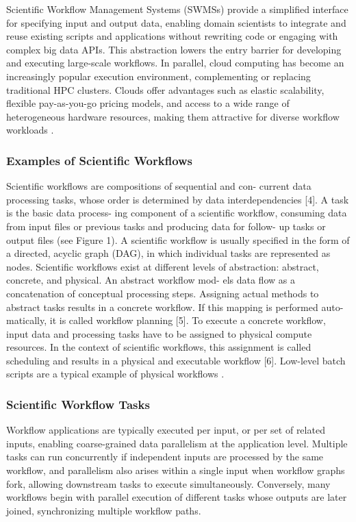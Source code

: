 Scientific Workflow Management Systems (SWMSs) provide a simplified interface for specifying input and output data, enabling domain scientists to integrate and reuse existing scripts and applications without rewriting code or engaging with complex big data APIs. This abstraction lowers the entry barrier for developing and executing large-scale workflows. In parallel, cloud computing has become an increasingly popular execution environment, complementing or replacing traditional HPC clusters. Clouds offer advantages such as elastic scalability, flexible pay-as-you-go pricing models, and access to a wide range of heterogeneous hardware resources, making them attractive for diverse workflow workloads \cite{Bader_2022}.


\subsubsection{Examples of Scientific Workflows}
\label{sec:background_workflows_examples}
Scientific workflows are compositions of sequential and con- current data processing tasks, whose order is determined by data interdependencies [4]. A task is the basic data process- ing component of a scientific workflow, consuming data from input files or previous tasks and producing data for follow- up tasks or output files (see Figure 1). A scientific workflow is usually specified in the form of a directed, acyclic graph (DAG), in which individual tasks are represented as nodes. Scientific workflows exist at different levels of abstraction: abstract, concrete, and physical. An abstract workflow mod- els data flow as a concatenation of conceptual processing steps. Assigning actual methods to abstract tasks results in a concrete workflow. If this mapping is performed auto- matically, it is called workflow planning [5]. To execute a concrete workflow, input data and processing tasks have to be assigned to physical compute resources. In the context of scientific workflows, this assignment is called scheduling and results in a physical and executable workflow [6]. Low-level batch scripts are a typical example of physical workflows \cite{Bux2013}.

\subsubsection{Scientific Workflow Tasks}
\label{sec:background_workflows_examples}
Workflow applications are typically executed per input, or per set of related inputs, enabling coarse-grained data parallelism at the application level. Multiple tasks can run concurrently if independent inputs are processed by the same workflow, and parallelism also arises within a single input when workflow graphs fork, allowing downstream tasks to execute simultaneously. Conversely, many workflows begin with parallel execution of different tasks whose outputs are later joined, synchronizing multiple workflow paths.

